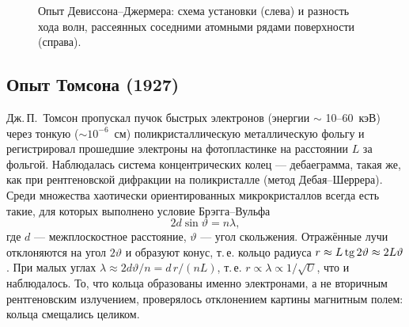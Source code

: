 \begin{figure}[htbp]
\centering
{}
\caption{Опыт Девиссона--Джермера: схема установки (слева) и разность хода волн,
рассеянных соседними атомными рядами поверхности (справа).}
\label{fig:2:dg}
\end{figure}

\subsection{Опыт Томсона (1927)}

Дж.\,П.~Томсон пропускал пучок быстрых электронов (энергии $\sim$ 10--60~кэВ) через тонкую
($\sim10^{-6}$~см) поликристаллическую металлическую фольгу и регистрировал прошедшие электроны
на фотопластинке на расстоянии $L$ за фольгой. Наблюдалась система концентрических колец —
дебаеграмма, такая же, как при рентгеновской дифракции на поликристалле (метод Дебая--Шеррера).
Среди множества хаотически ориентированных микрокристаллов всегда есть такие, для которых
выполнено условие Брэгга--Вульфа
\begin{equation}\label{eq:2:bragg}
 2d\sin\vartheta=n\lambda ,
\end{equation}
где $d$ — межплоскостное расстояние, $\vartheta$ — угол скольжения. Отражённые лучи отклоняются
на угол $2\vartheta$ и образуют конус, т.\,е. кольцо радиуса $r\approx L\operatorname{tg}2\vartheta\approx2L\vartheta$.
При малых углах $\lambda\approx 2d\vartheta/n=d\,r/(nL)$, т.\,е. $r\propto\lambda\propto1/\sqrt U$, что
и наблюдалось. То, что кольца образованы именно электронами, а не вторичным рентгеновским
излучением, проверялось отклонением картины магнитным полем: кольца смещались целиком.

